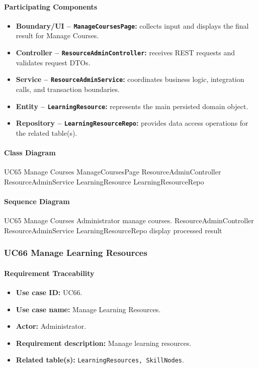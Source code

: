 \paragraph{Participating Components}

\begin{itemize}
    \item \textbf{Boundary/UI -- \texttt{ManageCoursesPage}:} collects input and displays the final result for Manage Courses.
    \item \textbf{Controller -- \texttt{ResourceAdminController}:} receives REST requests and validates request DTOs.
    \item \textbf{Service -- \texttt{ResourceAdminService}:} coordinates business logic, integration calls, and transaction boundaries.
    \item \textbf{Entity -- \texttt{LearningResource}:} represents the main persisted domain object.
    \item \textbf{Repository -- \texttt{LearningResourceRepo}:} provides data access operations for the related table(s).
\end{itemize}

\paragraph{Class Diagram}

\ClassDiagram
{UC65 Manage Courses}
{ManageCoursesPage}
{ResourceAdminController}
{ResourceAdminService}
{LearningResource}
{LearningResourceRepo}

\paragraph{Sequence Diagram}

\SequenceDiagram
{UC65 Manage Courses}
{Administrator}
{manage courses.}
{ResourceAdminController}
{ResourceAdminService}
{LearningResourceRepo}
{display processed result}

\subsubsection{UC66 Manage Learning Resources}

\paragraph{Requirement Traceability}

\begin{itemize}
    \item \textbf{Use case ID:} UC66.
    \item \textbf{Use case name:} Manage Learning Resources.
    \item \textbf{Actor:} Administrator.
    \item \textbf{Requirement description:} Manage learning resources.
    \item \textbf{Related table(s):} \texttt{LearningResources, SkillNodes}.
\end{itemize}

